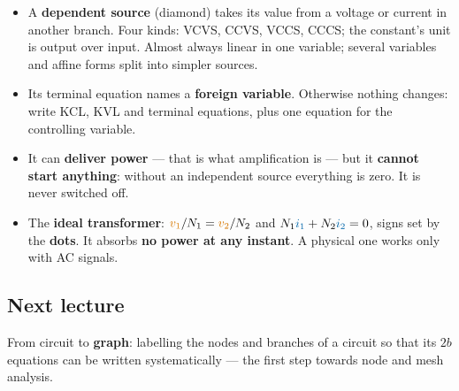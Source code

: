 \documentclass[11pt,a4paper]{article}
\newcommand{\Icol}[1]{\textcolor{ccur}{#1}}
\newcommand{\Vcol}[1]{\textcolor{cvolt}{#1}}
\begin{document}
\begin{itemize}
  \item A \textbf{dependent source} (diamond) takes its value from a voltage or current in
        another branch. Four kinds: VCVS, CCVS, VCCS, CCCS; the constant's unit is output
        over input. Almost always linear in one variable; several variables and affine
        forms split into simpler sources.
  \item Its terminal equation names a \textbf{foreign variable}. Otherwise nothing
        changes: write KCL, KVL and terminal equations, plus one equation for the
        controlling variable.
  \item It can \textbf{deliver power} --- that is what amplification is --- but it
        \textbf{cannot start anything}: without an independent source everything is zero.
        It is never switched off.
  \item The \textbf{ideal transformer}: $\Vcol{v_1}/N_1 = \Vcol{v_2}/N_2$ and
        $N_1\Icol{i_1} + N_2\Icol{i_2} = 0$, signs set by the \textbf{dots}. It absorbs
        \textbf{no power at any instant}. A physical one works only with AC signals.
\end{itemize}

\subsection*{Next lecture}
From circuit to \textbf{graph}: labelling the nodes and branches of a circuit so that its
$2b$ equations can be written systematically --- the first step towards node and mesh
analysis.
\end{document}
